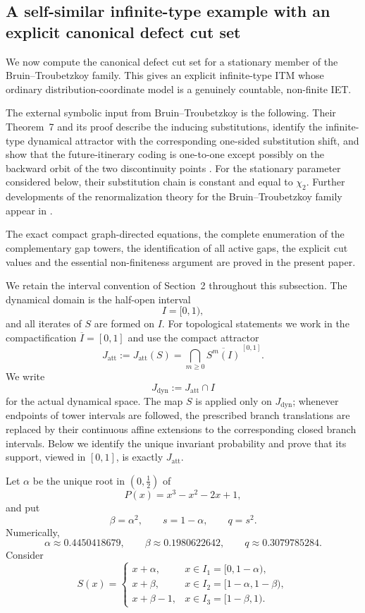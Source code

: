 \documentclass[11pt]{amsart}
\theoremstyle{plain}
\theoremstyle{definition}
\theoremstyle{remark}
\begin{document}
\subsection{A self-similar infinite-type example with an explicit canonical defect cut set}
\label{subsec:BT-explicit-defect}

We now compute the canonical defect cut set for a stationary member of the
Bruin--Troubetzkoy family. This gives an explicit infinite-type ITM whose ordinary
distribution-coordinate model is a genuinely countable, non-finite IET.

The external symbolic input from Bruin--Troubetzkoy is the following. Their
Theorem~7 and its proof describe the inducing substitutions, identify the
infinite-type dynamical attractor with the corresponding one-sided substitution
shift, and show that the future-itinerary coding is one-to-one except
possibly on the backward orbit of the two discontinuity points
\cite[Theorem~7, pp.~130 and 135]{BruinTroubetzkoy2003}.
For the stationary parameter considered below, their substitution chain is
constant and equal to \(\chi_2\). Further developments of the renormalization theory for
the Bruin--Troubetzkoy family appear in
\cite{ArtigianiHubertSkripchenko2026}.

The exact compact graph-directed equations, the complete enumeration of
the complementary gap towers, the identification of all active gaps, the
explicit cut values and the essential non-finiteness argument are proved in
the present paper.

We retain the interval convention of Section~2 throughout this subsection. The dynamical
domain is the half-open interval
\[
        I=[0,1),
\]
and all iterates of \(S\) are formed on \(I\). For topological statements we work in the
compactification \(\overline I=[0,1]\) and use the compact attractor
\[
        J_{\mathrm{att}}
        :=
        J_{\mathrm{att}}(S)
        =
        \bigcap_{m\geq0}\overline{S^m(I)}^{\,[0,1]}.
\]
We write
\[
        J_{\mathrm{dyn}}:=J_{\mathrm{att}}\cap I
\]
for the actual dynamical space. The map \(S\) is applied only on
\(J_{\mathrm{dyn}}\); whenever endpoints of tower intervals are followed, the prescribed
branch translations are replaced by their continuous affine extensions to the corresponding
closed branch intervals.
Below we identify the unique invariant probability and prove that its support, viewed in
\([0,1]\), is exactly \(J_{\mathrm{att}}\).

Let \(\alpha\) be the unique root in \((0,\frac12)\) of
\[
        P(x)=x^3-x^2-2x+1,
\]
and put
\[
        \beta=\alpha^2,
        \qquad
        s=1-\alpha,
        \qquad
        q=s^2.
\]
Numerically,
\[
        \alpha\approx0.4450418679,
        \qquad
        \beta\approx0.1980622642,
        \qquad
        q\approx0.3079785284.
\]
Consider
\[
S(x)=
\begin{cases}
 x+\alpha, & x\in I_1=[0,1-\alpha),\\[1mm]
 x+\beta, & x\in I_2=[1-\alpha,1-\beta),\\[1mm]
 x+\beta-1, & x\in I_3=[1-\beta,1).
\end{cases}
\tag{8.1}
\label{eq:BT-map}
\]
\end{document}
